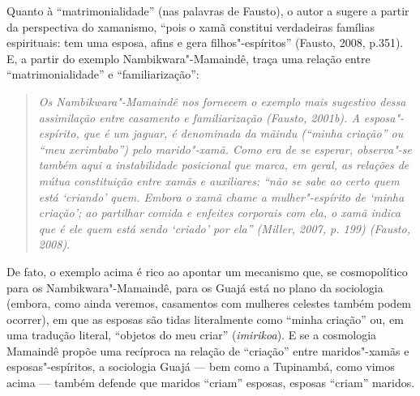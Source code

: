 Quanto à ``matrimonialidade'' (nas palavras de Fausto), o autor a sugere a
partir da perspectiva do xamanismo, ``pois o xamã constitui verdadeiras
famílias espirituais: tem uma esposa, afins e gera filhos"-espíritos''
(Fausto, 2008, p.351). E, a partir do exemplo Nambikwara"-Mamaindê, traça
uma relação entre ``matrimonialidade'' e ``familiarização'':

\begin{quote}
\emph{Os Nambikwara"-Mamaindê nos fornecem o exemplo mais sugestivo dessa
assimilação entre casamento e familiarização (Fausto, 2001b). A
esposa"-espírito, que é um jaguar, é denominada da \emph{mãindu} (``minha
criação'' ou ``meu xerimbabo'') pelo marido"-xamã. Como era de se
esperar, observa"-se também aqui a instabilidade posicional que marca, em
geral, as relações de mútua constituição entre xamãs e auxiliares: ``não
se sabe ao certo quem está `criando' quem. Embora o xamã chame a
mulher"-espírito de `minha criação'; ao partilhar comida e enfeites
corporais com ela, o xamã indica que é ele quem está sendo `criado' por
ela'' (Miller, 2007, p. 199) (Fausto, 2008)}.
\end{quote}

De fato, o exemplo acima é rico ao apontar um mecanismo que, se
cosmopolítico para os Nambikwara"-Mamaindê, para os Guajá está no plano
da sociologia (embora, como ainda veremos, casamentos com mulheres
celestes também podem ocorrer), em que as esposas são tidas literalmente
como ``minha criação'' ou, em uma tradução literal, ``objetos do meu criar''
(\emph{imirikoa}). E se a cosmologia Mamaindê propõe uma recíproca na
relação de ``criação'' entre maridos"-xamãs e esposas"-espíritos, a
sociologia Guajá --- bem como a Tupinambá, como vimos acima --- também
defende que maridos ``criam'' esposas, esposas ``criam'' maridos.

